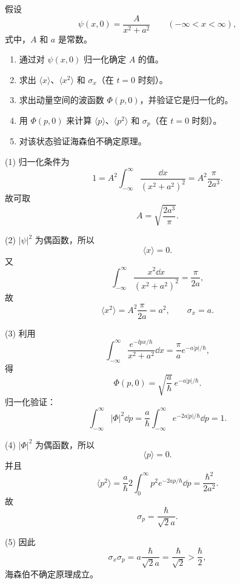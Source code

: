 \begin{question}
假设
\[
\psi(x,0)=\frac{A}{x^2+a^2}\qquad(-\infty<x<\infty),
\]
式中，$A$ 和 $a$ 是常数。
\begin{enumerate}
\item 通过对 $\psi(x,0)$ 归一化确定 $A$ 的值。
\item 求出 $\langle x\rangle$、$\langle x^2\rangle$ 和 $\sigma_x$（在 $t=0$ 时刻）。
\item 求出动量空间的波函数 $\Phi(p,0)$，并验证它是归一化的。
\item 用 $\Phi(p,0)$ 来计算 $\langle p\rangle$、$\langle p^2\rangle$ 和 $\sigma_p$（在 $t=0$ 时刻）。
\item 对该状态验证海森伯不确定原理。
\end{enumerate}
\end{question}
\begin{solution}
(1) 归一化条件为
\[
1=A^2\int_{-\infty}^{\infty}\frac{\dd x}{(x^2+a^2)^2}
=A^2\frac{\pi}{2a^3}.
\]
故可取
\[
\boxed{A=\sqrt{\frac{2a^3}{\pi}}.}
\]

(2) $|\psi|^2$ 为偶函数，所以
\[
\langle x\rangle=0.
\]
又
\[
\int_{-\infty}^{\infty}\frac{x^2\dd x}{(x^2+a^2)^2}=\frac{\pi}{2a},
\]
故
\[
\langle x^2\rangle=A^2\frac{\pi}{2a}=a^2,
\qquad
\boxed{\sigma_x=a.}
\]

(3) 利用
\[
\int_{-\infty}^{\infty}\frac{e^{-\ii px/\hbar}}{x^2+a^2}\dd x
=\frac\pi a e^{-a|p|/\hbar},
\]
得
\[
\boxed{\Phi(p,0)=\sqrt{\frac a\hbar}\,e^{-a|p|/\hbar}.}
\]
归一化验证：
\[
\int_{-\infty}^{\infty}|\Phi|^2\dd p
=\frac a\hbar\int_{-\infty}^{\infty}e^{-2a|p|/\hbar}\dd p=1.
\]

(4) $|\Phi|^2$ 为偶函数，所以
\[
\langle p\rangle=0.
\]
并且
\[
\langle p^2\rangle=\frac a\hbar 2\int_0^\infty p^2e^{-2ap/\hbar}\dd p
=\frac{\hbar^2}{2a^2}.
\]
故
\[
\boxed{\sigma_p=\frac{\hbar}{\sqrt2a}.}
\]

(5) 因此
\[
\sigma_x\sigma_p=a\frac{\hbar}{\sqrt2a}=\frac\hbar{\sqrt2}>\frac\hbar2,
\]
海森伯不确定原理成立。
\end{solution}

